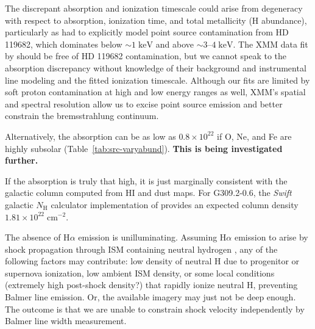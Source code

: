 \documentclass[preprint2,tighten,trackchanges]{aastex6}
\newcommand*{\mt}{\mathrm}
\newcommand*{\unit}[1]{\;\mt{#1}}  %
\newcommand*{\abt}{\mathord{\sim}} %
\newcommand*{\nH}{N_{\mathrm{H}}}
\newcommand*{\nHUnits}{\times 10^{22} \unit{cm^{-2}}}
\newcommand*{\AV}{A_{\mathrm{V}}}
\begin{document}
The discrepant absorption and ionization timescale could arise from degeneracy
with respect to absorption, ionization time, and total metallicity (H
abundance), particularly as \citet{rakowski2001} had to explicitly model point
source contamination from HD 119682, which dominates
below $\abt 1 \unit{keV}$ and above $\abt 3$--$4 \unit{keV}$.
The XMM data fit by \citet{safi-harb2007} should be free of HD 119682
contamination, but we cannot speak to the absorption discrepancy without
knowledge of their background and instrumental line modeling and the fitted
ionization timescale.
Although our fits are limited by soft proton contamination at high and
low energy ranges as well, XMM's spatial and spectral resolution allow us to
excise point source emission and better constrain the bremsstrahlung continuum.

Alternatively, the absorption can be as low as $0.8 \times 10^{22}$ if
O, Ne, and Fe are highly subsolar (Table~\ref{tab:src-varyabund}).
\textbf{This is being investigated further.}

If the absorption is truly that high, it is just marginally consistent with
the galactic column computed from HI and dust maps.
For G309.2-0.6, the \textit{Swift} galactic $\nH$ calculator implementation of
\citet{willingale2013} provides an expected column density $1.81 \nHUnits$.

The absence of H$\alpha$ emission is unilluminating.
Assuming H$\alpha$ emission to arise by shock propagation through ISM
containing neutral hydrogen \citep{chevalier1978},  %
any of the following factors may contribute: low density of neutral H due to
progenitor or supernova ionization, low ambient ISM density, or some local
conditions (extremely high post-shock density?) that rapidly ionize neutral H,
preventing Balmer line emission.
Or, the available imagery may just not be deep enough.
The outcome is that we are unable to constrain shock velocity independently by
Balmer line width measurement.
\end{document}
